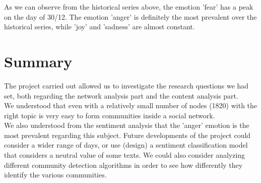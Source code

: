 \documentclass[12pt,journal,compsoc]{IEEEtran}
\begin{document}
As we can observe from the historical series above, the emotion 'fear' has a peak on the day of 30/12. The emotion 'anger' is definitely the most prevalent over the historical series, while 'joy' and 'sadness' are almost constant.

\section{Summary}
The project carried out allowed us to investigate the research questions we had set, both regarding the network analysis part and the content analysis part.\\
We understood that even with a relatively small number of nodes (1820) with the right topic is very easy to form communities inside a social network.\\
We also understood from the sentiment analysis that the 'anger' emotion is the most prevalent regarding this subject.
Future developments of the project could consider a wider range of days, or use (design) a sentiment classification model that considers a neutral value of some texts. We could also consider analyzing different community detection algorithms in order to see how differently they identify the various communities.


\nocite{*}
\printbibliography
\end{document}
